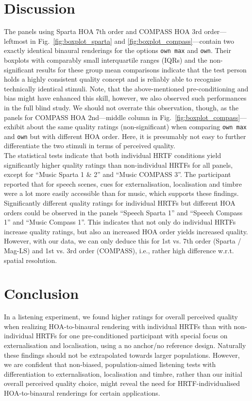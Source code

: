 \documentclass[conference]{IEEEtran}
\def\NewL{\\\noindent\hspace*{5mm}}
\begin{document}
\section{Discussion}
%
The panels using Sparta HOA 7th order and COMPASS HOA 3rd order---leftmost in Fig.~\ref{fig:boxplot_sparta} and \ref{fig:boxplot_compass}---contain two exactly identical binaural renderings for the options \texttt{own max} and \texttt{own}.
%
Their boxplots with comparably small interquartile ranges (IQRs) and the non-significant results for these group mean comparisons indicate that the test person holds a highly consistent quality concept and is reliably able to recognise technically identical stimuli.
%
Note, that the above-mentioned pre-conditioning and bias might have enhanced this skill, however, we also observed such performances in the full blind study.
%
We should not overrate this observation, though, as the panels for COMPASS HOA 2nd---middle column in Fig.~\ref{fig:boxplot_compass}---exhibit about the same quality ratings (non-significant) when comparing \texttt{own max} and \texttt{own} but with different HOA order.
%
Here, it is presumably not easy to further differentiate the two stimuli in terms of perceived quality.
%
\NewL The statistical tests indicate that both individual HRTF conditions yield significantly higher quality ratings than non-individual HRTFs for all panels, except for \quad ``Music Sparta 1 \& 2'' \quad and \quad ``Music COMPASS 3''.
%
The participant reported that for speech scenes, cues for externalisation, localisation and timbre were a lot more easily accessible than for music, which supports these findings.
%
Significantly different quality ratings for individual HRTFs but different HOA orders could be observed in the panels \quad ``Speech Sparta 1'' \quad and \quad ``Speech Compass 1'' \quad  and \quad ``Music Compass 1''.
%
This indicates that not only do individual HRTFs increase quality ratings, but also an increased HOA order yields increased quality.
%
However, with our data, we can only deduce this for 1st vs. 7th order (Sparta / Mag-LS) and 1st vs. 3rd order (COMPASS), i.e., rather high difference w.r.t. spatial resolution.


\section{Conclusion}
In a listening experiment, we found higher ratings for overall perceived quality when realizing HOA-to-binaural rendering with individual HRTFs than with non-individual HRTFs for one pre-conditioned participant with special focus on externalisation and localisation, using a no anchor/no reference design.
%
Naturally these findings should not be extrapolated towards larger populations.
%
However, we are confident that non-biased, population-aimed listening tests with differentiation to externalisation, localisation and timbre, rather than our initial overall perceived quality choice, might reveal the need for HRTF-individualised HOA-to-binaural renderings for certain applications.



%
\end{document}
